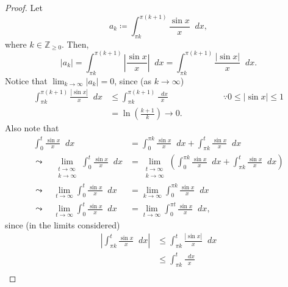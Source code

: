\documentclass[a4paper]{article}
\newcommand*\diff{\mathop{}\!d} %
\theoremstyle{definition}
\begin{document}
\begin{proof}
    Let
    \begin{equation*}
        a_k \coloneq \int_{\pi k}^{\pi(k+1)} \frac{\sin x}{x} \diff x,
    \end{equation*}
    where $k \in \mathbb{Z}_{\geq 0}$.
    Then,
    \begin{equation*}
        |a_k| = \int_{\pi k}^{\pi(k+1)} \left| \frac{\sin x}{x} \right| \diff x = \int_{\pi k}^{\pi(k+1)} \frac{|\sin x|}{x} \diff x.
    \end{equation*}
    Notice that $\lim_{k \to \infty} |a_k| = 0$, since (as $k \to \infty$)
    \begin{align*}
        \int_{\pi k}^{\pi(k+1)} \frac{|\sin x|}{x} \diff x & \leq \int_{\pi k}^{\pi(k+1)} \frac{\diff x}{x} & \qquad \qquad \because 0 \leq |\sin x| \leq 1 \\
                                                           & = \ln \left(\frac{k+1}{k}\right) \to 0.        &
    \end{align*}
    Also note that
    \begin{align*}
        \int_{0}^{t} \frac{\sin x}{x} \diff x                                     & = \int_{0}^{\pi k} \frac{\sin x}{x} \diff x + \int_{\pi k}^{t} \frac{\sin x}{x} \diff x \\
        \leadsto \quad \lim_{\substack{t \to \infty                                                                                                                         \\ k \to \infty}} \int_{0}^{t} \frac{\sin x}{x} \diff x &= \lim_{\substack{t \to \infty \\ k \to \infty}} \left( \int_{0}^{\pi k} \frac{\sin x}{x} \diff x + \int_{\pi k}^{t} \frac{\sin x}{x} \diff x  \right) \\
        \leadsto \quad \lim_{t \to \infty}  \int_{0}^{t} \frac{\sin x}{x} \diff x & = \lim_{k \to \infty}\int_{0}^{\pi k} \frac{\sin x}{x} \diff x                          \\
        \leadsto \quad \lim_{t \to \infty}  \int_{0}^{t} \frac{\sin x}{x} \diff x & = \lim_{t \to \infty}\int_{0}^{\pi t} \frac{\sin x}{x} \diff x,
    \end{align*}
    since (in the limits considered)
    \begin{align*}
        \left|\int_{\pi k}^{t} \frac{\sin x}{x} \diff x \right| & \leq \int_{\pi k}^{t} \frac{|\sin x|}{x} \diff x \\
                                                                & \leq \int_{\pi k}^{t} \frac{\diff x}{x}          \\

\end{align*}
\end{proof}
\end{document}
